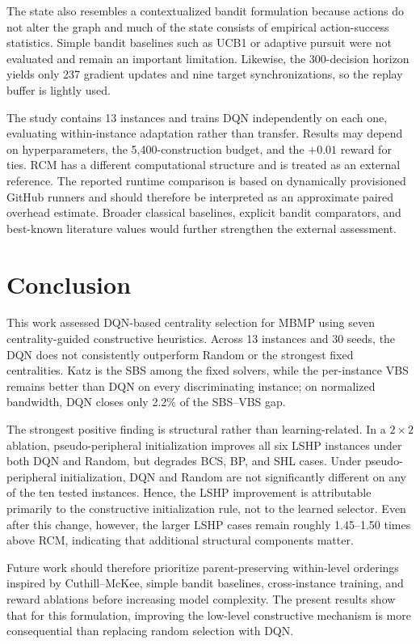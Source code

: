 \documentclass[runningheads]{llncs}
\begin{document}
The state also resembles a contextualized bandit formulation because actions do not alter the graph and much of the state consists of empirical action-success statistics. Simple bandit baselines such as UCB1 or adaptive pursuit were not evaluated and remain an important limitation. Likewise, the 300-decision horizon yields only 237 gradient updates and nine target synchronizations, so the replay buffer is lightly used.

The study contains 13 instances and trains DQN independently on each one, evaluating within-instance adaptation rather than transfer. Results may depend on hyperparameters, the 5,400-construction budget, and the $+0.01$ reward for ties. RCM has a different computational structure and is treated as an external reference. The reported runtime comparison is based on dynamically provisioned GitHub runners and should therefore be interpreted as an approximate paired overhead estimate. Broader classical baselines, explicit bandit comparators, and best-known literature values would further strengthen the external assessment.


\section{Conclusion}

This work assessed DQN-based centrality selection for MBMP using seven centrality-guided constructive heuristics. Across 13 instances and 30 seeds, the DQN does not consistently outperform Random or the strongest fixed centralities. Katz is the SBS among the fixed solvers, while the per-instance VBS remains better than DQN on every discriminating instance; on normalized bandwidth, DQN closes only 2.2\% of the SBS--VBS gap.

The strongest positive finding is structural rather than learning-related. In a $2\times2$ ablation, pseudo-peripheral initialization improves all six LSHP instances under both DQN and Random, but degrades BCS, BP, and SHL cases. Under pseudo-peripheral initialization, DQN and Random are not significantly different on any of the ten tested instances. Hence, the LSHP improvement is attributable primarily to the constructive initialization rule, not to the learned selector. Even after this change, however, the larger LSHP cases remain roughly 1.45--1.50 times above RCM, indicating that additional structural components matter.

Future work should therefore prioritize parent-preserving within-level orderings inspired by Cuthill--McKee, simple bandit baselines, cross-instance training, and reward ablations before increasing model complexity. The present results show that for this formulation, improving the low-level constructive mechanism is more consequential than replacing random selection with DQN.
\end{document}
